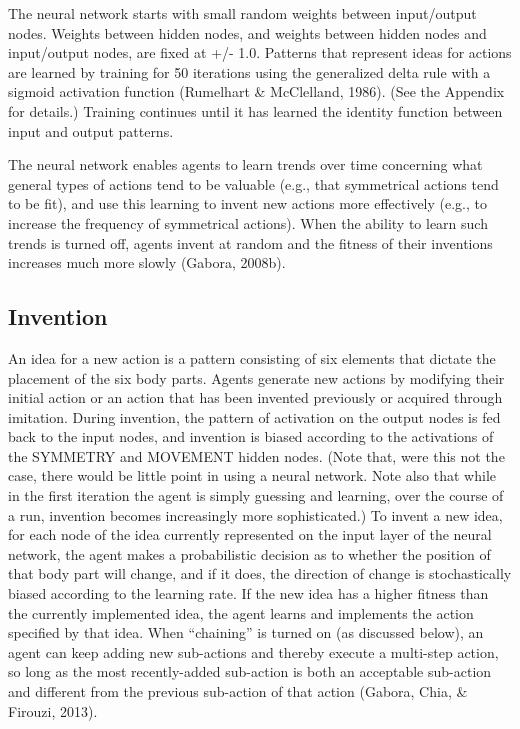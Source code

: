 \documentclass[a4paper,12pt,man,british]{apa6}
\begin{document}
The neural network starts with small random weights between input/output nodes. Weights between hidden nodes, and weights between hidden nodes and input/output nodes, are fixed at +/- 1.0. Patterns that represent ideas for actions are learned by training for 50 iterations using the generalized delta rule with a sigmoid activation function (Rumelhart \& McClelland, 1986). (See the Appendix for details.) Training continues until it has learned the identity function between input and output patterns. 

The neural network enables agents to learn trends over time concerning what general types of actions tend to be valuable (e.g., that symmetrical actions tend to be fit), and use this learning to invent new actions more effectively (e.g., to increase the frequency of symmetrical actions). When the ability to learn such trends is turned off, agents invent at random and the fitness of their inventions increases much more slowly (Gabora, 2008b). 

\subsection{Invention}
An idea for a new action is a pattern consisting of six elements that dictate the placement of the six body parts. Agents generate new actions by modifying their initial action or an action that has been invented previously or acquired through imitation. During invention, the pattern of activation on the output nodes is fed back to the input nodes, and invention is biased according to the activations of the SYMMETRY and MOVEMENT hidden nodes. (Note that, were this not the case, there would be little point in using a neural network. Note also that while in the first iteration the agent is simply guessing and learning, over the course of a run, invention becomes increasingly more sophisticated.) To invent a new idea, for each node of the idea currently represented on the input layer of the neural network, the agent makes a probabilistic decision as to whether the position of that body part will change, and if it does, the direction of change is stochastically biased according to the learning rate. If the new idea has a higher fitness than the currently implemented idea, the agent learns and implements the action specified by that idea. When ``chaining'' is turned on (as discussed below), an agent can keep adding new sub-actions and thereby execute a multi-step action, so long as the most recently-added sub-action is both an acceptable sub-action and different from the previous sub-action of that action (Gabora, Chia, \& Firouzi, 2013).
\end{document}
